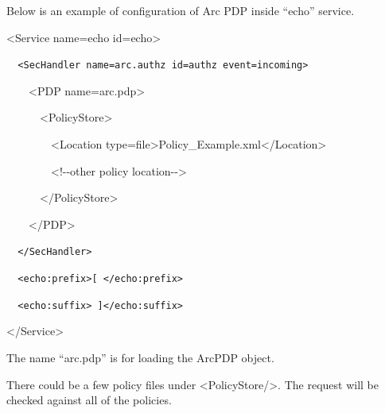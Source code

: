 \documentclass{article}
\begin{document}
{\upshape\color{black}
Below is an example of configuration of Arc PDP inside
{\textquotedblleft}echo{\textquotedblright} service.}

{\ttfamily\color{black}
{\textless}Service name={\textquotedbl}echo{\textquotedbl}
id={\textquotedbl}echo{\textquotedbl}{\textgreater}}

{\upshape\color{black}
\foreignlanguage{spanish}{\texttt{\ \ }}\texttt{{\textless}SecHandler
name={\textquotedbl}arc.authz{\textquotedbl}
id={\textquotedbl}authz{\textquotedbl}
event={\textquotedbl}incoming{\textquotedbl}{\textgreater}}}

{\ttfamily\color{black}
\ \ \ \ {\textless}PDP
name={\textquotedbl}arc.pdp{\textquotedbl}{\textgreater}}

{\ttfamily\color{black}
\ \ \ \ \ \ {\textless}PolicyStore{\textgreater}}

{\ttfamily\color{black}
\ \ \ \ \ \ \ \ {\textless}Location
type={\textquotedbl}file{\textquotedbl}{\textgreater}Policy\_Example.xml{\textless}/Location{\textgreater}}

{\ttfamily\color{black}
\ \ \ \ \ \ \ \ {\textless}!-{}-other policy location-{}-{\textgreater}}

{\ttfamily\color{black}
\ \ \ \ \ \ {\textless}/PolicyStore{\textgreater}}

{\ttfamily\color{black}
\ \ \ \ {\textless}/PDP{\textgreater}}

{\upshape\color{black}
\texttt{\ \ }\foreignlanguage{spanish}{\texttt{{\textless}/SecHandler{\textgreater}}}}

{\upshape\color{black}
\foreignlanguage{spanish}{\texttt{\ \ }}\foreignlanguage{spanish}{\texttt{{\textless}echo:prefix{\textgreater}[
{\textless}/echo:prefix{\textgreater}}}}

{\upshape\color{black}
\foreignlanguage{spanish}{\texttt{\ \ }}\texttt{{\textless}echo:suffix{\textgreater}
]{\textless}/echo:suffix{\textgreater}}}

{\ttfamily\color{black}
{\textless}/Service{\textgreater}}

{\color{black}
The name {\textquotedblleft}arc.pdp{\textquotedblright} is for loading
the ArcPDP object.}

{\color{black}
There could be a few policy files under
{\textless}PolicyStore/{\textgreater}. The request will be checked
against all of the policies.}
\end{document}
